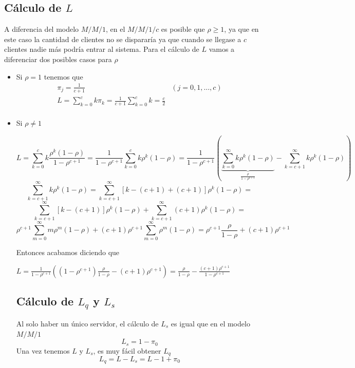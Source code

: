 		\subsection{C\'alculo de $L$} A diferencia del modelo $M/M/1$, en el $M/M/1/c$ es posible que $\rho\geq1$, ya que en este caso la cantidad de clientes no se disparar\'ia ya que cuando se llegase a $c$ clientes nadie m\'as podr\'ia entrar al sistema. Para el c\'alculo de $L$ vamos a diferenciar dos posibles casos para $\rho$
		\begin{itemize}
			\item  Si $\rho=1$ tenemos que 
			$$\begin{array}{cc}
				\pi_j=\frac{1}{c+1} & (j=0,1,...,c)\\
				L=\displaystyle\sum_{k=0}^{c}k\pi_k=\frac{1}{c+1}\sum_{k=0}^{c}k=\frac{c}{2}& \\
				\end{array}$$
		
			\item Si $\rho\neq1$

					$$L=\sum_{k=0}^{c}k\frac{\rho^k (1-\rho)}{1-\rho^{c+1}}=\frac{1}{1-\rho^{c+1}}\sum_{k=0}^{c}k\rho^k (1-\rho)=\frac{1}{1-\rho^{c+1}}(\underbrace{\sum_{k=0}^{\infty}k\rho^k(1-\rho)}_{\displaystyle\frac{\rho}{1-\rho^{c+1}}}-\sum_{k=c+1}^{\infty}k\rho^k(1-\rho))$$
					$$\sum_{k=c+1}^{\infty}k\rho^k(1-\rho)=\sum_{k=c+1}^{\infty}[k-(c+1)+(c+1)]\rho^k(1-\rho)=$$
					$$\sum_{k=c+1}^{\infty}[k-(c+1)]\rho^k(1-\rho)+\sum_{k=c+1}^{\infty}(c+1)\rho^k(1-\rho)=$$
					$$\rho^{c+1}\sum_{m=0}^{\infty}m\rho^m(1-\rho)+(c+1)\rho^{c+1}\sum_{m=0}^{\infty}\rho^m(1-\rho)=\rho^{c+1}\frac{\rho}{1-\rho}+(c+1)\rho^{c+1}$$

				Entonces acabamos diciendo que 
				\begin{center}
					$L=\frac{1}{1-\rho^{c+1}}((1-\rho^{c+1})\frac{\rho}{1-\rho}-(c+1)\rho^{c+1})=\frac{\rho}{1-\rho}-\frac{(c+1)\rho^{c+1}}{1-\rho^{c+1}}$
				\end{center}
			\subsection{C\'alculo de $L_q$ y $L_s$}
			\hspace{0.5cm} Al solo haber un \'unico servidor, el c\'alculo de $L_s$ es igual que en el modelo $M/M/1$
				$$L_s=1-\pi_0$$
			Una vez tenemos $L$ y $L_s$, es muy f\'acil obtener $L_q$
				$$L_q=L-L_s=L-1+\pi_0$$

\end{itemize}
